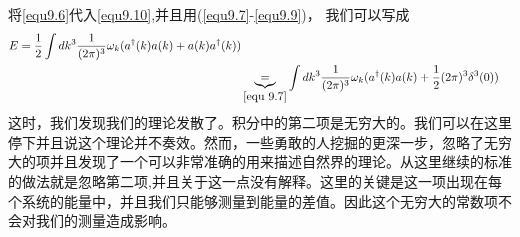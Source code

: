 将\ref{equ9.6}代入\ref{equ9.10},并且用(\ref{equ9.7}-\ref{equ9.9})， 我们可以写成
\begin{align} \label{equ9.11}
E=\frac{1}{2}\int dk^{3}\frac{1}{(2\pi)^{3}} \omega_{k}(a^{\dag}(k)a(k)+a(k)a^{\dag}(k))\\ &\underbrace{=}_{\ref{equ 9.7}}\int dk^{3}\frac{1}{(2\pi)^{3}} \omega_{k}(a^{\dag}(k)a(k)+\frac{1}{2}(2\pi)^{3}\delta^{3}(0))
\end{align}
这时，我们发现我们的理论发散了。积分中的第二项是无穷大的。我们可以在这里停下并且说这个理论并不奏效。然而，一些勇敢的人挖掘的更深一步，忽略了无穷大的项并且发现了一个可以非常准确的用来描述自然界的理论。从这里继续的标准的做法就是忽略第二项,并且关于这一点没有解释。这里的关键是这一项出现在每个系统的能量中，并且我们只能够测量到能量的差值。因此这个无穷大的常数项不会对我们的测量造成影响。





